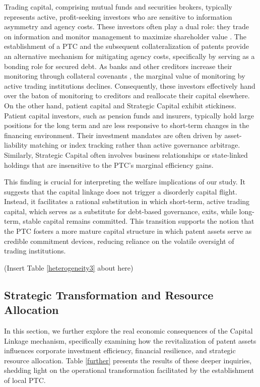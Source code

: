 \documentclass[12pt,a4paper]{article}
\begin{document}
Trading capital, comprising mutual funds and securities brokers, typically represents active, profit-seeking investors who are sensitive to information asymmetry and agency costs. These investors often play a dual role: they trade on information and monitor management to maximize shareholder value \citep{chemmanur2010going}. The establishment of a PTC and the subsequent collateralization of patents provide an alternative mechanism for mitigating agency costs, specifically by serving as a bonding role for secured debt. As banks and other creditors increase their monitoring through collateral covenants \citep{mann2018creditor}, the marginal value of monitoring by active trading institutions declines. Consequently, these investors effectively hand over the baton of monitoring to creditors and reallocate their capital elsewhere. On the other hand, patient capital and Strategic Capital exhibit stickiness. Patient capital investors, such as pension funds and insurers, typically hold large positions for the long term and are less responsive to short-term changes in the financing environment. Their investment mandates are often driven by asset-liability matching or index tracking rather than active governance arbitrage. Similarly, Strategic Capital often involves business relationships or state-linked holdings that are insensitive to the PTC's marginal efficiency gains.

This finding is crucial for interpreting the welfare implications of our study. It suggests that the capital linkage does not trigger a disorderly capital flight. Instead, it facilitates a rational substitution in which short-term, active trading capital, which serves as a substitute for debt-based governance, exits, while long-term, stable capital remains committed. This transition supports the notion that the PTC fosters a more mature capital structure in which patent assets serve as credible commitment devices, reducing reliance on the volatile oversight of trading institutions.

\begin{center}
    (Insert Table \ref{heterogeneity3} about here)
\end{center}

\subsection{Strategic Transformation and Resource Allocation}
In this section, we further explore the real economic consequences of the Capital Linkage mechanism, specifically examining how the revitalization of patent assets influences corporate investment efficiency, financial resilience, and strategic resource allocation. Table \ref{further} presents the results of these deeper inquiries, shedding light on the operational transformation facilitated by the establishment of local PTC.
\end{document}
